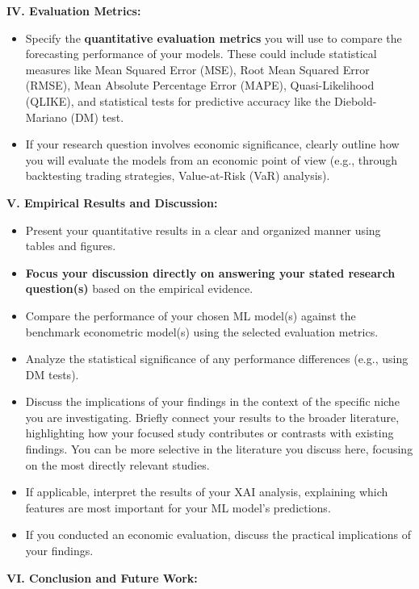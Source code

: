 \documentclass[11pt,preprint]{elsarticle}
\numberwithin{equation}{section}
\numberwithin{figure}{section}
\numberwithin{table}{section}
\def\tightlist{} %
\begin{document}
\textbf{IV. Evaluation Metrics:}

\begin{itemize}
\tightlist
\item
  Specify the \textbf{quantitative evaluation metrics} you will use to
  compare the forecasting performance of your models. These could
  include statistical measures like Mean Squared Error (MSE), Root Mean
  Squared Error (RMSE), Mean Absolute Percentage Error (MAPE),
  Quasi-Likelihood (QLIKE), and statistical tests for predictive
  accuracy like the Diebold-Mariano (DM) test.
\item
  If your research question involves economic significance, clearly
  outline how you will evaluate the models from an economic point of
  view (e.g., through backtesting trading strategies, Value-at-Risk
  (VaR) analysis).
\end{itemize}

\textbf{V. Empirical Results and Discussion:}

\begin{itemize}
\tightlist
\item
  Present your quantitative results in a clear and organized manner
  using tables and figures.
\item
  \textbf{Focus your discussion directly on answering your stated
  research question(s)} based on the empirical evidence.
\item
  Compare the performance of your chosen ML model(s) against the
  benchmark econometric model(s) using the selected evaluation metrics.
\item
  Analyze the statistical significance of any performance differences
  (e.g., using DM tests).
\item
  Discuss the implications of your findings in the context of the
  specific niche you are investigating. Briefly connect your results to
  the broader literature, highlighting how your focused study
  contributes or contrasts with existing findings. You can be more
  selective in the literature you discuss here, focusing on the most
  directly relevant studies.
\item
  If applicable, interpret the results of your XAI analysis, explaining
  which features are most important for your ML model's predictions.
\item
  If you conducted an economic evaluation, discuss the practical
  implications of your findings.
\end{itemize}

\textbf{VI. Conclusion and Future Work:}
\end{document}
